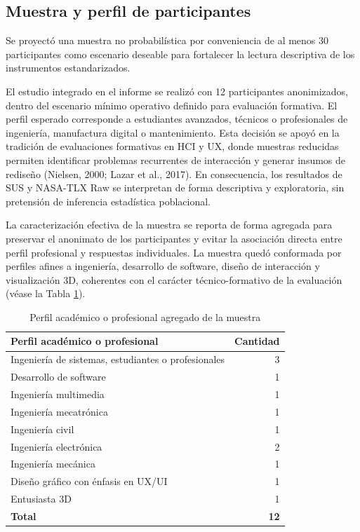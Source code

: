 \subsection{Muestra y perfil de participantes}

Se proyectó una muestra no probabilística por conveniencia de al menos 30 participantes como escenario deseable para fortalecer la lectura descriptiva de los instrumentos estandarizados.

El estudio integrado en el informe se realizó con 12 participantes anonimizados, dentro del escenario mínimo operativo definido para evaluación formativa. El perfil esperado corresponde a estudiantes avanzados, técnicos o profesionales de ingeniería, manufactura digital o mantenimiento. Esta decisión se apoyó en la tradición de evaluaciones formativas en HCI y UX, donde muestras reducidas permiten identificar problemas recurrentes de interacción y generar insumos de rediseño (Nielsen, 2000; Lazar et al., 2017). En consecuencia, los resultados de SUS y NASA-TLX Raw se interpretan de forma descriptiva y exploratoria, sin pretensión de inferencia estadística poblacional.

La caracterización efectiva de la muestra se reporta de forma agregada para preservar el anonimato de los participantes y evitar la asociación directa entre perfil profesional y respuestas individuales. La muestra quedó conformada por perfiles afines a ingeniería, desarrollo de software, diseño de interacción y visualización 3D, coherentes con el carácter técnico-formativo de la evaluación (véase la Tabla \ref{tab:perfil_agregado_participantes}).

\begin{table}[H]
    \caption{Perfil académico o profesional agregado de la muestra}
    \label{tab:perfil_agregado_participantes}
    \centering
    \small
    \singlespacing
    \begin{tabular}{p{10.4cm}r}
        \hline
        \textbf{Perfil académico o profesional} & \textbf{Cantidad} \\ \hline
        Ingeniería de sistemas, estudiantes o profesionales & 3 \\
        Desarrollo de software & 1 \\
        Ingeniería multimedia & 1 \\
        Ingeniería mecatrónica & 1 \\
        Ingeniería civil & 1 \\
        Ingeniería electrónica & 2 \\
        Ingeniería mecánica & 1 \\
        Diseño gráfico con énfasis en UX/UI & 1 \\
        Entusiasta 3D & 1 \\ \hline
        \textbf{Total} & \textbf{12} \\ \hline
    \end{tabular}
    \par\vspace{0.5\baselineskip}
\end{table}

